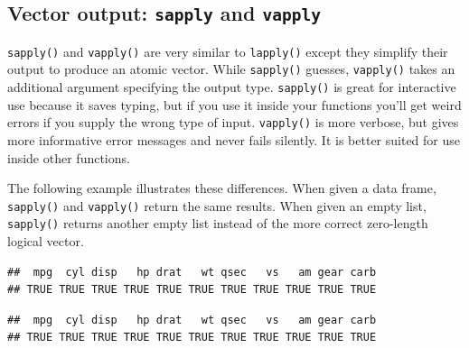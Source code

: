 \hypertarget{vector-output-sapply-and-vapply}{%
\subsection{\texorpdfstring{Vector output: \texttt{sapply} and
\texttt{vapply}}{Vector output: sapply and vapply}}\label{vector-output-sapply-and-vapply}}

\texttt{sapply()} and \texttt{vapply()} are very similar to
\texttt{lapply()} except they simplify their output to produce an atomic
vector. While \texttt{sapply()} guesses, \texttt{vapply()} takes an
additional argument specifying the output type. \texttt{sapply()} is
great for interactive use because it saves typing, but if you use it
inside your functions you'll get weird errors if you supply the wrong
type of input. \texttt{vapply()} is more verbose, but gives more
informative error messages and never fails silently. It is better suited
for use inside other functions.  

The following example illustrates these differences. When given a data
frame, \texttt{sapply()} and \texttt{vapply()} return the same results.
When given an empty list, \texttt{sapply()} returns another empty list
instead of the more correct zero-length logical vector.

\begin{Shaded}
\begin{Highlighting}[]
\end{Highlighting}
\end{Shaded}

\begin{verbatim}
##  mpg  cyl disp   hp drat   wt qsec   vs   am gear carb 
## TRUE TRUE TRUE TRUE TRUE TRUE TRUE TRUE TRUE TRUE TRUE
\end{verbatim}

\begin{Shaded}
\begin{Highlighting}[]
\NormalTok{(}\NormalTok{))}
\end{Highlighting}
\end{Shaded}

\begin{verbatim}
##  mpg  cyl disp   hp drat   wt qsec   vs   am gear carb 
## TRUE TRUE TRUE TRUE TRUE TRUE TRUE TRUE TRUE TRUE TRUE
\end{verbatim}

